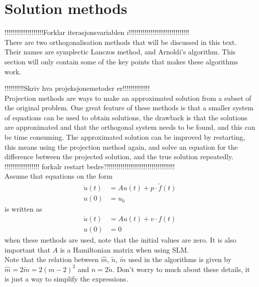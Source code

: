 \section{Solution methods}
!!!!!!!!!!!!!!!!!!!!Forklar iterasjonsvariablen $i$!!!!!!!!!!!!!!!!!!!!!!!!!!!!!!!\\
There are two orthogonalisation methods that will be discussed in this text. Their names are symplectic Lanczos method, and Arnoldi's algorithm. This section will only contain some of the key points that makes these algorithms work.  %


!!!!!!!!!!Skriv hva projeksjonemetoder er!!!!!!!!!!!!!!\\
Projection methods are ways to make an approximated solution from a subset of the original problem. One great feature of these methods is that a smaller system of equations can be used to obtain solutions, the drawback is that the solutions are approximated and that the orthogonal system needs to be found, and this can be time consuming. The approximated solution can be improved by restarting, this means using the projection method again, and solve an equation for the difference between the projected solution, and the true solution repeatedly.\\
!!!!!!!!!!!!!!!!!! forkalr restart bedre?!!!!!!!!!!!!!!!!!!!!!!!!!!!!!!!!!!!\\

Assume that equations on the form
\begin{equation}
\begin{aligned}
\dot{u}(t) &= Au(t) + p \cdot \tilde{f}(t) \\
u(0) &= u_0
\end{aligned}
\end{equation}
is written as 
\begin{equation}
\begin{aligned}
\dot{u}(t) &= Au(t) + v \cdot f(t) \\
u(0) &= 0
\end{aligned}
\label{eqn:PMform}
\end{equation}
when these methods are used, note that the initial values are zero. It is also important that $A$ is a Hamiltonian matrix when using SLM. \\

Note that the relation between $\hat{m}$, $\tilde{n}$, $\tilde{m}$ used in the algorithms is given by $\hat{m} = 2\tilde{m}= 2(m-2)^2$ and $ n = 2\tilde{n}$. Don't worry to much about these details, it is just a way to simplify the expressions.\\
